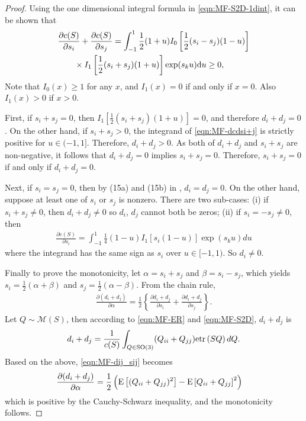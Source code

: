 \begin{proof}
	Using the one dimensional integral formula in \eqref{eqn:MF-S2D-1dint}, it can be shown that
	\begin{align}
		&\frac{\partial c(S)}{\partial s_i} + \frac{\partial c(S)}{\partial s_j} = \int_{-1}^{1} \frac{1}{2}(1+u)I_0\left[\frac{1}{2}(s_i-s_j)(1-u)\right] \nonumber \\
		&\qquad \times I_1\left[\frac{1}{2}(s_i+s_j)(1+u)\right] \exp(s_ku) \mathrm{d} u \geq 0, \label{eqn:MF-dcdsi+j}
	\end{align}
	Note that $I_0(x) \geq 1$ for any $x$, and $I_1(x)=0$ if and only if $x=0$.
	Also $I_1(x) >0$ if $x>0$.
	
	First, if $s_i+s_j=0$, then $I_1\left[\frac{1}{2}(s_i+s_j)(1+u)\right] = 0$, and therefore $d_i+d_j = 0$.
	On the other hand, if $s_i+s_j>0$, the integrand of \eqref{eqn:MF-dcdsi+j} is strictly positive for $u\in(-1,1]$.
	Therefore, $d_i+d_j>0$.
	As both of $d_i+d_j$ and $s_i+s_j$ are non-negative, it follows that $d_i+d_j =0$ implies $s_i+s_j=0$. 
	Therefore, $s_i+s_j = 0$ if and only if $d_i+d_j=0$.
	
	Next, if $s_i=s_j=0$, then by (15a) and (15b) in \cite{lee2018bayesian}, $d_i=d_j=0$.
	On the other hand, suppose at least one of $s_i$ or $s_j$ is nonzero. There are two sub-cases: (i) if $s_i+s_j\neq 0$, then $d_i+d_j\neq 0$ so $d_i$, $d_j$ cannot both be zeros;
	(ii) if $s_i = -s_j \neq 0$, then
	\begin{align*}
		\frac{\partial c(S)}{\partial s_i} = \int_{-1}^1 \frac{1}{4}(1-u) I_1[s_i(1-u)]\exp(s_ku)du
	\end{align*}
	where the integrand has the same sign as $s_i$ over $u\in[-1,1)$.
	So $d_i\neq 0$.
	
	Finally to prove the monotonicity, let $\alpha=s_i+s_j$ and $\beta = s_i-s_j$, which yields $s_i = \frac{1}{2}(\alpha+\beta)$ and $s_j = \frac{1}{2}(\alpha-\beta)$.
	From the chain rule,
	\begin{align} \label{eqn:MF-dij_sij}
		\frac{\partial (d_i+d_j)}{\partial \alpha} = \frac{1}{2} \left\{ \frac{\partial d_i+d_j}{\partial s_i} + \frac{\partial d_i+d_j}{\partial s_j} \right\}.
	\end{align}
	Let $Q\sim\mathcal{M}(S)$, then according to \eqref{eqn:MF-ER} and \eqref{eqn:MF-S2D}, $d_i+d_j$ is
	\begin{align*}
		d_i + d_j  = \frac{1}{c(S)}\int_{Q\in\mathrm{SO}(3)}(Q_{ii}+Q_{jj}) \mathrm{etr}\left( SQ \right) dQ.
	\end{align*}
	Based on the above, \eqref{eqn:MF-dij_sij} becomes
	\begin{align*}
		\frac{\partial (d_i+d_j)}{\partial \alpha} & = \frac{1}{2} \left( \mathrm{E}\left[ (Q_{ii}+Q_{jj})^2 \right] - \mathrm{E}\left[ Q_{ii}+Q_{jj} \right]^2 \right)
	\end{align*}
	which is positive by the Cauchy-Schwarz inequality, and the monotonicity follows.
\end{proof}

